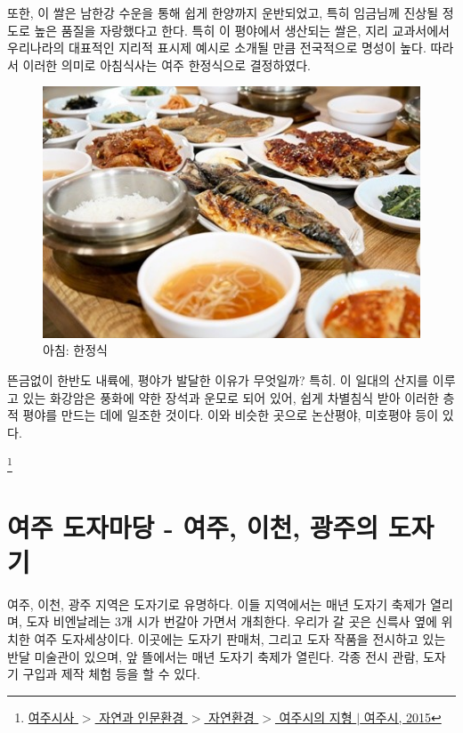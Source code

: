 \documentclass[chapter, oneside]{oblivoir}
\begin{document}
또한, 이 쌀은 남한강 수운을 통해 쉽게 한양까지 운반되었고, 특히 임금님께 진상될 정도로 높은 품질을 자랑했다고 한다.
특히 이 평야에서 생산되는 쌀은, 지리 교과서에서 우리나라의 대표적인 지리적 표시제 예시로 소개될 만큼 전국적으로 명성이 높다.
따라서 이러한 의미로 아침식사는 여주 한정식으로 결정하였다.
 

\begin{figure}
    \centering
    \includegraphics[width=.8\textwidth]{img/한정식.jpg}
    \caption{아침: 한정식 \protect\footnotemark}
    \label{fig:my_labe2}
\end{figure}
뜬금없이 한반도 내륙에, 평야가 발달한 이유가 무엇일까?
특히. 이 일대의 산지를 이루고 있는 화강암은 풍화에 약한 장석과 운모로 되어 있어, 
쉽게 차별침식 받아 이러한 층적 평야를 만드는 데에 일조한 것이다.
이와 비슷한 곳으로 논산평야, 미호평야 등이 있다.


\footnote{ \href{https://www.yeoju.go.kr/history/main.jsp}{여주시사 $>$ 자연과 인문환경 $>$ 자연환경 $>$ 여주시의 지형 $|$ 여주시, 2015}}

\section{여주 도자마당 - 여주, 이천, 광주의 도자기}
여주, 이천, 광주 지역은 도자기로 유명하다. 이들 지역에서는 매년 도자기 축제가 열리며, 도자 비엔날레는 3개 시가 번갈아 가면서 개최한다.
우리가 갈 곳은 신륵사 옆에 위치한 여주 도자세상이다.
 이곳에는 도자기 판매처, 그리고 도자 작품을 전시하고 있는 반달 미술관이 있으며, 앞 뜰에서는 매년 도자기 축제가 열린다. 
 각종 전시 관람, 도자기 구입과 제작 체험 등을 할 수 있다.
\end{document}
